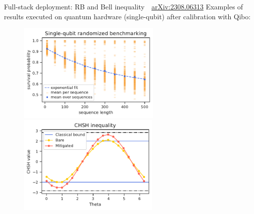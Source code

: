\documentclass[aspectratio=169, 8pt, xcolor={svgnames}, hyperref={linkcolor=black}]{beamer}
\begin{document}
\begin{frame}[fragile]{Full-stack deployment: RB and Bell inequality \hfill \faBook\,\, \href{https://arxiv.org/abs/2308.06313}{arXiv:2308.06313}}
  Examples of results executed on quantum hardware (single-qubit) after calibration with Qibo:
  \begin{figure}
    \includegraphics[height=4.8cm]{figures/standard_rb.pdf}
    \includegraphics[height=4.8cm]{figures/bell_sweep_fig.pdf}
  \end{figure}
\end{frame}
\end{document}
